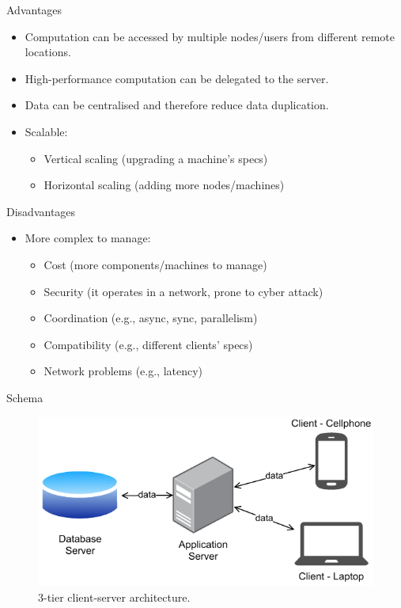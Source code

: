 \documentclass{beamer}
\begin{document}
\begin{frame}{Advantages}
\begin{itemize}
\item Computation can be accessed by multiple nodes/users from different remote locations.
\item High-performance computation can be delegated to the server.
\item Data can be centralised and therefore reduce data duplication.
\item Scalable:
\begin{itemize}
\item Vertical scaling (upgrading a machine's specs)
\item Horizontal scaling (adding more nodes/machines)
\end{itemize}
\end{itemize}
\end{frame}

\begin{frame}{Disadvantages}
\begin{itemize}
\item More complex to manage:
\begin{itemize}
\item Cost (more components/machines to manage)
\item Security (it operates in a network, prone to cyber attack)
\item Coordination (e.g., async, sync, parallelism)
\item Compatibility (e.g., different clients' specs)
\item Network problems (e.g., latency)
\end{itemize}
\end{itemize}
\end{frame}

\begin{frame}{Schema}
\begin{figure}[h]
    \centering
    \includegraphics[width=\textwidth]{client-server-3-tier}
    \caption{3-tier client-server architecture.}
    \label{fig:client-server-schema}
\end{figure}
\end{frame}
\end{document}
